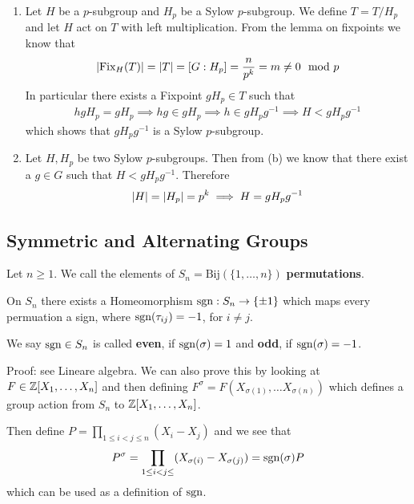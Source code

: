 \begin{enumerate}
	\item Let $H$ be a $p$-subgroup and $H_p$ be a Sylow $p$-subgroup. We define $T = T/H_p$ and let $H$ act on $T$ with left multiplication. From the lemma on fixpoints we know that
		\begin{align*}
			\vert\text{Fix}_H(T)\vert = \vert T\vert = [G: H_p] = \frac{n}{p^{k}} = m \neq 0 \mod p
		\end{align*}
		In particular there exists a Fixpoint $g H_p \in T$ such that
		\begin{align*}
			hgH_p = gH_p \implies hg \in gH_p \implies h \in gH_p g^{-1} \implies H < gH_p g^{-1}
		\end{align*}
		which shows that $gH_pg^{-1}$ is a Sylow $p$-subgroup.
		
	\item Let $H,H_p$ be two Sylow $p$-subgroups. Then from (b) we know that there exist a $g \in G$ such that $H < gH_pg^{-1}$. Therefore
		\begin{align*}
			\vert H\vert = \vert H_p\vert = p^{k} \implies H = gH_pg^{-1}
		\end{align*}
\end{enumerate}


\subsection{Symmetric and Alternating Groups}

\begin{theorem}[]
	Let $n \geq 1$. We call the elements of $S_n = \text{Bij}(\{1, \ldots, n\})$ \textbf{permutations}.

	On $S_n$ there exists a Homeomorphism $\operatorname{sgn}: S_n \to \{\pm 1\}$ which maps every permuation a sign, where $\operatorname{sgn}(\tau_{ij}) = -1$, for $i\neq j$.

	We say $\operatorname{sgn} \in S_n$ is called \textbf{even}, if $\operatorname{sgn}(\sigma) = 1$ and \textbf{odd}, if $\operatorname{sgn}(\sigma) = -1$.
\end{theorem}


Proof: see Lineare algebra. We can also prove this by looking at $F \in \mathbb{Z}[X_1, \ldots, X_n]$ and then defining $F^{\sigma} = F(X_{\sigma(1)}, \ldots X_{\sigma(n)})$ which defines a group action from $S_n$ to $\mathbb{Z}[X_1, \ldots, X_n]$.

Then define $P = \prod_{1 \leq i < j \leq n}(X_i - X_j)$ and we see that
\begin{align*}
	P^{\sigma} = \prod_{1 \leq i < j \leq}(X_{\sigma(i)} - X_{\sigma(j)}) = \operatorname{sgn}(\sigma)P
\end{align*}
which can be used as a definition of $\operatorname{sgn}$.

